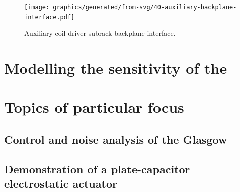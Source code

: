 \begin{figure}
  \centering
  \texttt{[image: graphics/generated/from-svg/40-auxiliary-backplane-interface.pdf]}
  \caption[Auxiliary subrack backplane interface]{\label{fig:aux-backplane-interface}Auxiliary coil driver subrack backplane interface.}
\end{figure}

\section{Modelling the sensitivity of the \SSM{}}

\section{Topics of particular focus}

\subsection{Control and noise analysis of the Glasgow \SSM{}}

\subsection{Demonstration of a plate-capacitor electrostatic actuator}